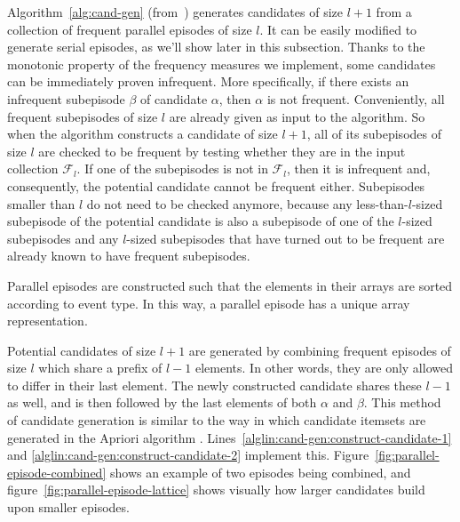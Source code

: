 Algorithm~\ref{alg:cand-gen} (from~\citep{mannila1997discovery}) generates candidates of size $ l + 1 $ from a collection of frequent parallel episodes of size $ l $. It can be easily modified to generate serial episodes, as we'll show later in this subsection. Thanks to the monotonic property of the frequency measures we implement, some candidates can be immediately proven infrequent. More specifically, if there exists an infrequent subepisode $ \beta $ of candidate $ \alpha $, then $ \alpha $ is not frequent.
Conveniently, all frequent subepisodes of size $ l $ are already given as input to the algorithm. So when the algorithm constructs a candidate of size $ l + 1 $, all of its subepisodes of size $ l $ are checked to be frequent by testing whether they are in the input collection $ \mathcal{F}_l $. If one of the subepisodes is not in $ \mathcal{F}_l $, then it is infrequent and, consequently, the potential candidate cannot be frequent either.
Subepisodes smaller than $ l $ do not need to be checked anymore, because any less-than-$ l $-sized subepisode of the potential candidate is also a subepisode of one of the $ l $-sized subepisodes and any $ l $-sized subepisodes that have turned out to be frequent are already known to have frequent subepisodes.

Parallel episodes are constructed such that the elements in their arrays are sorted according to event type. In this way, a parallel episode has a unique array representation.

Potential candidates of size $ l + 1 $ are generated by combining frequent episodes of size $ l $ which share a prefix of $ l - 1 $ elements. In other words, they are only allowed to differ in their last element. The newly constructed candidate shares these $ l - 1 $ as well, and is then followed by the last elements of both $ \alpha $ and $ \beta $. This method of candidate generation is similar to the way in which candidate itemsets are generated in the Apriori algorithm \citep{mannila1997discovery}. Lines~\ref{alglin:cand-gen:construct-candidate-1} and \ref{alglin:cand-gen:construct-candidate-2} implement this. Figure~\ref{fig:parallel-episode-combined} shows an example of two episodes being combined, and figure~\ref{fig:parallel-episode-lattice} shows visually how larger candidates build upon smaller episodes.

